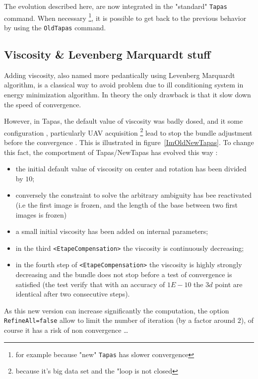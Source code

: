 The evolution described here, are now integrated in the "standard" {\tt Tapas} command.
When necessary \footnote{for example because "new"  {\tt Tapas} has slower convergence}, it is possible
to get back to the previous behavior by using the {\tt OldTapas} command.




\subsection{Viscosity \& Levenberg Marquardt stuff}

Adding viscosity, also named more pedantically using Levenberg Marquardt algorithm,
is a classical way to avoid problem due to ill conditioning system in energy minimization algorithm.
In theory the only drawback is that it slow down the speed of convergence.

However, in Tapas, the default value of viscosity was badly dosed, and it  some configuration ,
particularly UAV acquisition \footnote{because it's big data set and the "loop is not closed}
lead to stop the bundle adjustment before the convergence . This is illustrated in figure~\ref{ImOldNewTapas}.
 To change this fact, the comportment of Tapas/NewTapas has evolved this way :

\begin{itemize}
    \item  the initial default value of viscosity  on center and rotation has been divided by $10$;
    \item  conversely the constraint to solve the arbitrary ambiguity has bee reactivated (i.e the first image is
           frozen, and the length of the base between two first images is frozen)
    \item  a small initial viscosity has been added on internal parameters;
    \item  in the third {\tt <EtapeCompensation>} the viscosity is continuously decreasing;
    \item  in the fourth step of  {\tt <EtapeCompensation>} the viscosity is highly strongly decreasing and
           the bundle does not stop before a test of convergence is satisfied (the test verify that with an
           accuracy of $1E-10$ the $3d$ point are identical after two consecutive steps).
\end{itemize}

As this new version can increase significantly the computation, the option {\tt RefineAll=false}
allow to limit the number of iteration (by a factor around $2$), of course it has a risk of non convergence \dots


